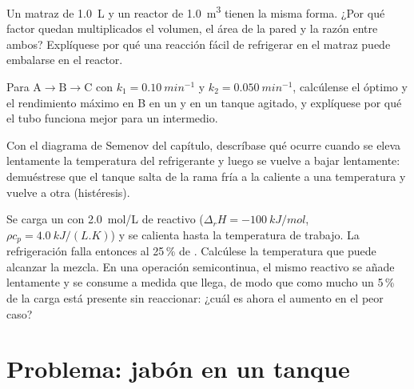 \begin{exercise}[$\star\star$]\label{exo:b2:continuous-reactors:9}
Un matraz de \qty{1.0}{L} y un reactor de \qty{1.0}{m^3} tienen la misma forma.
¿Por qué factor quedan multiplicados el volumen, el área de la pared y la razón entre ambos?
Explíquese por qué una reacción fácil de refrigerar en el matraz puede
embalarse en el reactor.
\end{exercise}

\begin{exercise}[$\star\star\star$]\label{exo:b2:continuous-reactors:10}
Para $\mathrm A \to \mathrm B \to \mathrm C$ con $k_1 = \qty{0.10}{min^{-1}}$
y $k_2 = \qty{0.050}{min^{-1}}$, calcúlense el  óptimo y el
rendimiento máximo en B en un  y en un tanque agitado, y explíquese
por qué el tubo funciona mejor para un intermedio.
\end{exercise}

\begin{exercise}[$\star\star\star$]\label{exo:b2:continuous-reactors:11}
Con el diagrama de Semenov del capítulo, descríbase qué ocurre cuando se eleva
lentamente la temperatura del refrigerante y luego se vuelve a bajar lentamente: demuéstrese que
el tanque salta de la rama fría a la caliente a una temperatura y vuelve a
otra (histéresis).
\end{exercise}

\begin{exercise}[$\star\star\star$]\label{exo:b2:continuous-reactors:12}
Se carga un  con \qty{2.0}{mol/L} de reactivo ($\Delta_r H =
\qty{-100}{kJ/mol}$, $\rho c_p = \qty{4.0}{kJ/(L.K)}$) y se calienta hasta la
temperatura de trabajo. La refrigeración falla entonces al 25\,\% de . Calcúlese la
temperatura que puede alcanzar la mezcla. En una operación semicontinua, el mismo
reactivo se añade lentamente y se consume a medida que llega, de modo que como mucho un 5\,\%
de la carga está presente sin reaccionar: ¿cuál es ahora el aumento en el peor caso?
\end{exercise}

\section{Problema: jabón en un tanque}

